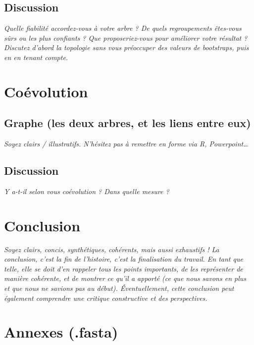 \documentclass[a4paper, 11pt]{article}
\begin{document}
\subsection{Discussion}
\emph{Quelle fiabilité accordez-vous à votre arbre ? De quels regroupements êtes-vous sûrs ou les plus confiants ? Que proposeriez-vous pour améliorer votre résultat ?}
\emph{
Discutez d’abord la topologie sans vous préoccuper des valeurs de bootstraps, puis en en tenant compte.}
\section{Coévolution}

\subsection{Graphe (les deux arbres, et les liens entre eux)}
\emph{Soyez clairs / illustratifs. N’hésitez pas à remettre en forme via R, Powerpoint…}

\subsection{Discussion}
\emph{Y a-t-il selon vous coévolution ? Dans quelle mesure ?}
\section{Conclusion}
\emph{Soyez clairs, concis, synthétiques, cohérents, mais aussi exhaustifs ! La conclusion, c’est la fin de l’histoire, c’est la finalisation du travail. En tant que telle, elle se doit d’en rappeler tous les points importants, de les représenter de manière cohérente, et de montrer ce qu’il a apporté (ce que nous savons en plus et que nous ne savions pas au début). Éventuellement, cette conclusion peut également comprendre une critique constructive et des perspectives.}

\printbibliography

\section{Annexes (.fasta)}
\end{document}
